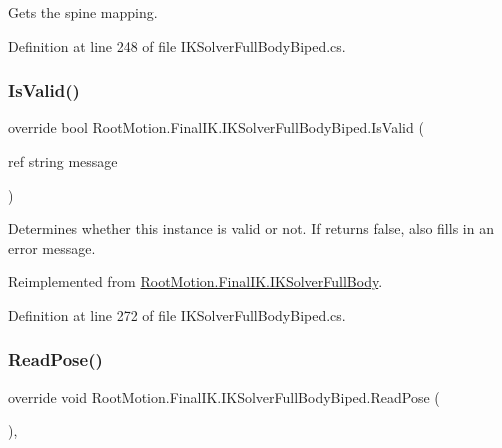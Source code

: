 Gets the spine mapping. 



Definition at line 248 of file I\+K\+Solver\+Full\+Body\+Biped.\+cs.

\mbox{\label{class_root_motion_1_1_final_i_k_1_1_i_k_solver_full_body_biped_a3a3db44c5ef5d7a508492225ae161f10}} 
\subsubsection{\texorpdfstring{Is\+Valid()}{IsValid()}}
{\footnotesize\ttfamily override bool Root\+Motion.\+Final\+I\+K.\+I\+K\+Solver\+Full\+Body\+Biped.\+Is\+Valid (\begin{DoxyParamCaption}\item[{ref string}]{message }\end{DoxyParamCaption})\hspace{0.3cm}{\ttfamily [virtual]}}



Determines whether this instance is valid or not. If returns false, also fills in an error message. 



Reimplemented from \mbox{\hyperlink{class_root_motion_1_1_final_i_k_1_1_i_k_solver_full_body_a52e5312dcea8441bec26f0a9c2bf54f2}{Root\+Motion.\+Final\+I\+K.\+I\+K\+Solver\+Full\+Body}}.



Definition at line 272 of file I\+K\+Solver\+Full\+Body\+Biped.\+cs.

\mbox{\label{class_root_motion_1_1_final_i_k_1_1_i_k_solver_full_body_biped_a4691b021c0446bb435caf9ba0022406e}} 
\subsubsection{\texorpdfstring{Read\+Pose()}{ReadPose()}}
{\footnotesize\ttfamily override void Root\+Motion.\+Final\+I\+K.\+I\+K\+Solver\+Full\+Body\+Biped.\+Read\+Pose (\begin{DoxyParamCaption}{ }\end{DoxyParamCaption})\hspace{0.3cm}{\ttfamily [protected]}, {\ttfamily [virtual]}}




